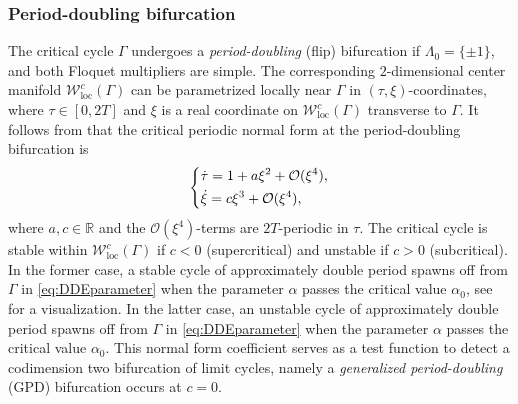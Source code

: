 \documentclass[english]{myarticle}
\DeclareMathOperator{\loc}{loc}
\begin{document}
\begin{sloppypar}
\subsubsection{Period-doubling bifurcation}
The critical cycle $\Gamma$ undergoes a \emph{period-doubling} (flip) bifurcation if $\Lambda_0 = \{\pm 1\}$, and both Floquet multipliers are simple. The corresponding $2$-dimensional center manifold $\mathcal{W}_{\loc}^{c}(\Gamma)$ can be parametrized locally near $\Gamma$ in $(\tau,\xi)$-coordinates, where $\tau \in [0,2T]$ and $\xi$ is a real coordinate on $\mathcal{W}_{\loc}^{c}(\Gamma)$ transverse to $\Gamma$. It follows from \cite[Theorem 26]{Article2} that the critical periodic normal form at the period-doubling bifurcation is 
\begin{equation} \label{eq:normal form pd}
    \begin{dcases}
    \dot{\tau} = 1 + a\xi^2 + \mathcal{O}(\xi^4),\\
    \dot{\xi} = c\xi^3 + \mathcal{O}(\xi^4),
    \end{dcases}
\end{equation}
where $a,c \in \mathbb{R}$ and the $\mathcal{O}(\xi^4)$-terms are $2T$-periodic in $\tau$. The critical cycle is stable within $\mathcal{W}_{\loc}^c(\Gamma)$ if $c < 0$ (supercritical) and unstable if $c > 0$ (subcritical). In the former case, a stable cycle of approximately double period spawns off from $\Gamma$ in \eqref{eq:DDEparameter} when the parameter $\alpha$ passes the critical value $\alpha_0$, see \cite[Figure 5.21]{Kuznetsov2023a} for a visualization. In the latter case, an unstable cycle of approximately double period spawns off from $\Gamma$ in \eqref{eq:DDEparameter} when the parameter $\alpha$ passes the critical value $\alpha_0$. This normal form coefficient serves as a test function to detect a codimension two bifurcation of limit cycles, namely a \emph{generalized period-doubling} (GPD) bifurcation occurs at $c=0$.


\end{sloppypar}
\end{document}
